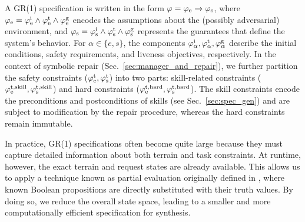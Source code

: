 A GR(1) specification is written in the form $\varphi = \varphi_\textrm{e} \to \varphi_\textrm{s}$,
where $\varphi_\textrm{e} = \varphi_\textrm{e}^\textrm{i} \land \varphi_\textrm{e}^\textrm{t} \land \varphi_\textrm{e}^\textrm{g}$ encodes the assumptions about the (possibly adversarial) environment,
and $\varphi_\textrm{s} = \varphi_\textrm{s}^\textrm{i} \land \varphi_\textrm{s}^\textrm{t} \land \varphi_\textrm{s}^\textrm{g}$ represents the guarantees that define the system’s behavior.
For $\alpha \in \{e, s\}$, the components $\varphi_\alpha^\textrm{i}, \varphi_\alpha^\textrm{t}, \varphi_\alpha^\textrm{g}$ describe the initial conditions, safety requirements, and liveness objectives, respectively.
In the context of symbolic repair (Sec.~\ref{sec:manager_and_repair}), we further partition the safety constraints ($\varphi_\textrm{e}^\textrm{t}, \varphi_\textrm{s}^\textrm{t}$) into two parts: skill-related constraints ($\varphi_\textrm{e}^\textrm{t,skill}, \varphi_\textrm{s}^\textrm{t,skill}$) and hard constraints ($\varphi_\textrm{e}^\textrm{t,hard}, \varphi_\textrm{s}^\textrm{t,hard}$).
The skill constraints encode the preconditions and postconditions of skills (see Sec.~\ref{sec:spec_gen}) and are subject to modification by the repair procedure, whereas the hard constraints remain immutable.




In practice, GR(1) specifications often become quite large because they must capture detailed information about both terrain and task constraints. At runtime, however, the exact terrain and request states are already available. This allows us to apply a technique known as partial evaluation originally defined in \citep{zhou2025physically}, where known Boolean propositions are directly substituted with their truth values. By doing so, we reduce the overall state space, leading to a smaller and more computationally efficient specification for synthesis.

